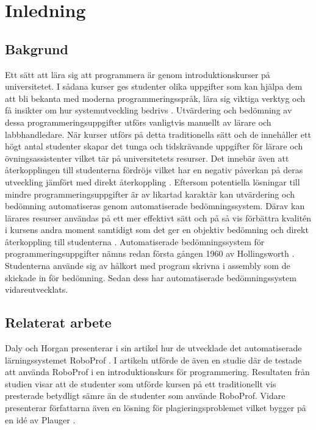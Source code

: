 \documentclass[a4paper,11pt]{article}
\begin{document}
{\section{Inledning}

\subsection{Bakgrund}\label{Bakgrund}

Ett sätt att lära sig att programmera är genom introduktionskurser på universitetet. I sådana kurser ges studenter olika uppgifter som kan hjälpa dem att bli bekanta med moderna programmeringsspråk, lära sig viktiga verktyg och få insikter om hur systemutveckling bedrivs \cite{douce_11}. Utvärdering och bedömning av dessa programmeringsuppgifter utförs vanligtvis manuellt av lärare och labbhandledare. När kurser utförs på detta traditionella sätt och de innehåller ett högt antal studenter skapar det tunga och tidskrävande uppgifter för lärare och övningsassistenter vilket tär på universitetets resurser. Det innebär även att återkopplingen till studenterna fördröjs vilket har en negativ påverkan på deras utveckling jämfört med direkt återkoppling \cite{japanerna_1}. Eftersom potentiella lösningar till mindre programmeringsuppgifter är av likartad karaktär kan utvärdering och bedömning automatiseras genom automatiserade bedömningssystem. Därav kan lärares resurser användas på ett mer effektivt sätt och på så vis förbättra kvalitén i kursens andra moment samtidigt som det ger en objektiv bedömning och direkt återkoppling till studenterna \cite{douce_11} \cite{hollingsworth_2} \cite{higgins_3}. Automatiserade bedömningssystem för programmeringsuppgifter nämns redan första gången 1960 av Hollingsworth \cite{hollingsworth_2}. Studenterna använde sig av hålkort med program skrivna i assembly som de skickade in för bedömning. Sedan dess har automatiserade bedömningssystem vidareutvecklats.

\subsection{Relaterat arbete}

Daly och Horgan \cite{roboprof_4} presenterar i sin artikel hur de utvecklade det automatiserade lärningssystemet RoboProf \cite{roboprof_4}. I artikeln utförde de även en studie där de testade att använda RoboProf i en introduktionskurs för programmering. Resultaten från studien visar att de studenter som utförde kursen på ett traditionellt vis presterade betydligt sämre än de studenter som använde RoboProf. Vidare presenterar författarna även en lösning för plagieringsproblemet vilket bygger på en idé av Plauger \cite{plaguer_5}.

}
\end{document}
